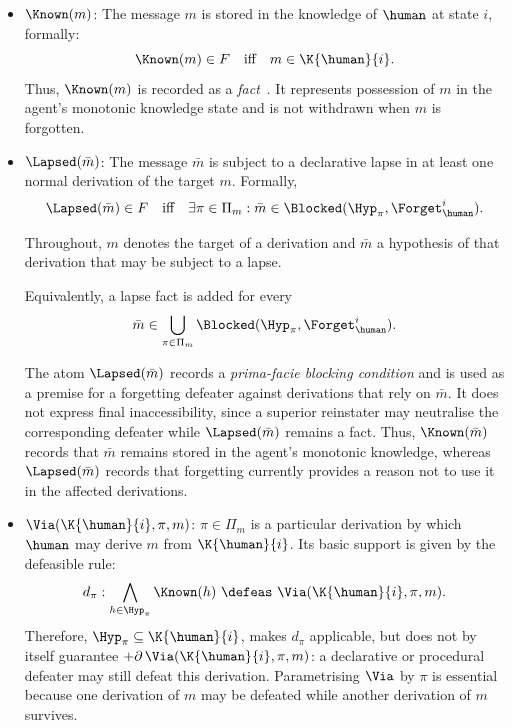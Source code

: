 \begin{itemize}
        \item $\Known(m)$: The message $m$ is stored in the knowledge of $\human$ at state $i$, formally:
        \[
        \Known(m)\in F\quad\text{iff}\quad m\in\K{\human}{i}. 
        \]
        Thus, $\Known(m)$ is recorded as a \emph{fact}~\cite{nute1994defeasible}. It represents possession of $m$ in the agent's monotonic knowledge state and is not withdrawn when $m$ is forgotten.
        
        \item $\Lapsed(\bar m)$: The message $\bar m$ is subject to a declarative lapse in at least one normal derivation of the target $m$. Formally,
        \[
        \Lapsed(\bar{m}) \in F \quad\text{iff}\quad \exists \pi\in\Pi_{m}: \bar m\in\Blocked(\Hyp_\pi,\Forget_\human^i).
        \]

        Throughout, $m$ denotes the target of a derivation and $\bar m$ a hypothesis of that derivation that may be subject to a lapse.
        
        Equivalently, a lapse fact is added for every
        \[
        \bar m\in \bigcup_{\pi\in\Pi_m}         \Blocked(\Hyp_\pi,\Forget_{\human}^{i}).
        \]

        The atom $\Lapsed(\bar m)$ records a \emph{prima-facie blocking condition} and is used as a premise for a forgetting defeater against derivations that rely on $\bar m$. It does not express final inaccessibility, since a superior reinstater may neutralise the corresponding defeater while $\Lapsed(\bar m)$ remains a fact. Thus, $\Known(\bar m)$ records that $\bar m$ remains stored in the agent's monotonic knowledge, whereas $\Lapsed(\bar m)$ records that forgetting currently provides a reason not to use it in the affected derivations.
        
        \item $\Via(\K{\human}{i}, \pi, m)$: $\pi\in\Pi_m$ is a particular derivation by which $\human$ may derive $m$ from $\K{\human}{i}$. Its basic support is given by the defeasible rule:
        \[
        d_\pi: \bigwedge_{h\in\Hyp_\pi}\Known(h) \ \defeas\ \Via(\K{\human}{i},\pi,m). 
        \]
        Therefore, $\Hyp_\pi\subseteq\K{\human}{i}$, makes $d_\pi$ applicable, but does not by itself guarantee  $+\partial\,\Via(\K{\human}{i},\pi,m)$: a declarative or procedural defeater may still defeat this derivation. Parametrising $\Via$ by $\pi$ is essential because one derivation of $m$ may be defeated while another derivation of $m$ survives. 
        

\end{itemize}
